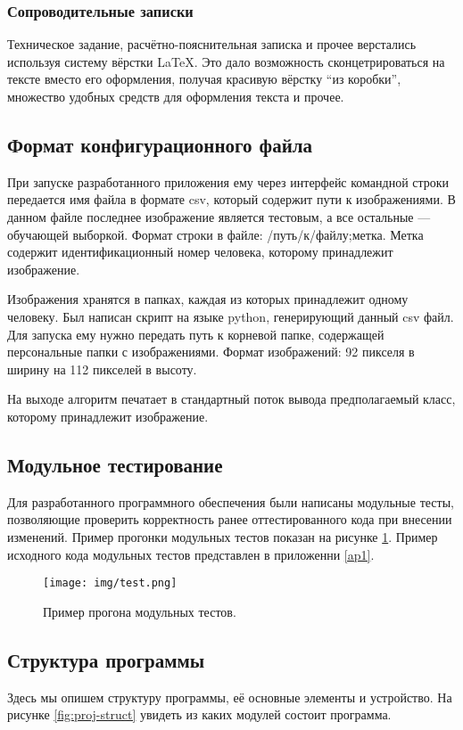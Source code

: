 \documentclass[a4paper,12pt]{report}
\numberwithin{equation}{section}
\begin{document}
\subsubsection{Сопроводительные записки}
Техническое задание, расчётно-пояснительная записка и прочее верстались
используя систему вёрстки \LaTeX . Это дало возможность сконцетрироваться на
тексте вместо его оформления, получая красивую вёрстку ``из коробки'', множество
удобных средств для оформления текста и прочее.

\subsection{Формат конфигурационного файла}
При запуске разработанного приложения ему через интерфейс командной строки
передается имя файла в формате csv, который содержит пути к изображениями. В
данном файле последнее изображение является тестовым, а все остальные ---
обучающей выборкой. Формат строки в файле: /путь/к/файлу;метка. Метка содержит
идентификационный номер человека, которому принадлежит изображение.


Изображения хранятся в папках, каждая из которых принадлежит одному
человеку. Был написан скрипт на языке python, генерирующий данный csv файл. Для
запуска ему нужно передать путь к корневой папке, содержащей персональные папки
с изображениями. Формат изображений: 92 пикселя в ширину на 112 пикселей в
высоту.


На выходе алгоритм печатает в стандартный поток вывода предполагаемый класс,
которому принадлежит изображение.

\subsection{Модульное тестирование}
Для разработанного программного обеспечения были написаны модульные тесты,
позволяющие проверить корректность ранее оттестированного кода при внесении
изменений. Пример прогонки модульных тестов показан на рисунке
\ref{fig:test}. Пример исходного кода модульных тестов представлен в приложенни
\ref{ap1}.

\begin{figure}[h!]
  \centering
  \texttt{[image: img/test.png]}
  \caption{Пример прогона модульных тестов.}
  \label{fig:test}
\end{figure}

\subsection{Структура программы}
Здесь мы опишем структуру программы, её основные элементы и устройство.
На рисунке \ref{fig:proj-struct} увидеть из каких модулей состоит программа.
\end{document}
